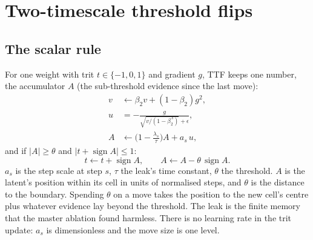 \documentclass[10pt,twocolumn]{article}
\newcommand{\sign}{\operatorname{sign}}
\begin{document}
\section{Two-timescale threshold flips}\label{sec:method}

\subsection{The scalar rule}
For one weight with trit $t\in\{-1,0,1\}$ and gradient $g$, TTF keeps one number, the accumulator $A$ (the
sub-threshold evidence since the last move):
\begin{align}
  v &\leftarrow \beta_2 v + (1-\beta_2) g^2, \\
  u &= -\frac{g}{\sqrt{v/(1-\beta_2^{\,s})}+\epsilon}, \\
  A &\leftarrow \Big(1-\frac{\lambda_s}{\tau}\Big) A + a_s\,u,
\end{align}
and if $|A|\ge\theta$ and $|t+\sign A|\le 1$:
\begin{equation}
  t \leftarrow t+\sign A,\qquad A\leftarrow A-\theta\,\sign A .
\end{equation}
$a_s$ is the step scale at step $s$, $\tau$ the leak's time constant, $\theta$ the threshold. $A$ is the latent's position
within its cell in units of normalised steps, and $\theta$ is the distance to the boundary. Spending $\theta$ on a move
takes the position to the new cell's centre plus whatever evidence lay beyond the threshold. The leak is the finite
memory that the master ablation found harmless. There is no
learning rate in the trit update: $a_s$ is dimensionless and the move size is one level.
\end{document}
